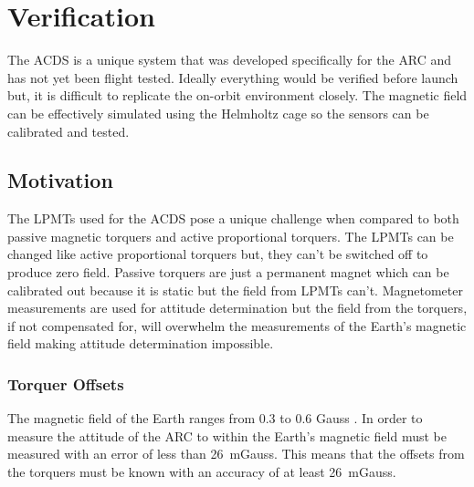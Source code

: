 
\chapter{Verification}

\label{ch:Verification}

The \ac{ACDS} is a unique system that was developed specifically for the \ac{ARC} and has not yet been flight tested. Ideally everything would be verified before launch but, it is difficult to replicate the on-orbit environment closely. The magnetic field can be effectively simulated using the Helmholtz cage so the sensors can be calibrated and tested. 

\section{Motivation}

The \acp{LPMT} used for the \ac{ACDS} pose a unique challenge when compared to both passive magnetic torquers and active proportional torquers. The \acp{LPMT} can be changed like active proportional torquers but, they can't be switched off to produce zero field. Passive torquers are just a permanent magnet which can be calibrated out because it is static but the field from \acp{LPMT} can't. Magnetometer measurements are used for attitude determination but the field from the torquers, if not compensated for, will overwhelm the measurements of the Earth's magnetic field making attitude determination impossible.

\subsection{Torquer Offsets}





The magnetic field of the Earth ranges from 0.3 to 0.6 Gauss \cite[pp.~114]{Wertz}. In order to measure the attitude of the \ac{ARC} to within {\textdegree} the Earth's magnetic field must be measured with an error of less than 26~mGauss. This means that the offsets from the torquers must be known with an accuracy of at least 26~mGauss.

